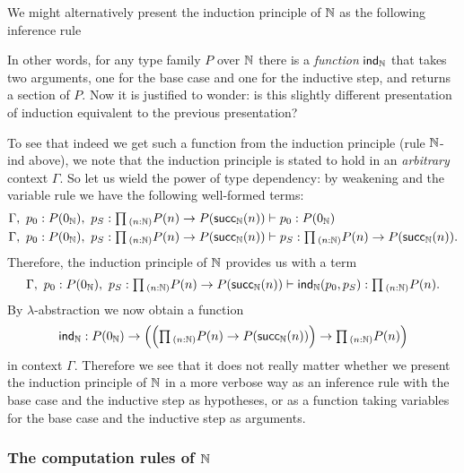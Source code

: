 \begin{rmk}
  We might alternatively present the induction principle of $\N$ as the following inference rule
  \begin{prooftree}
  \end{prooftree}
  In other words, for any type family $P$ over $\N$ there is a \emph{function} $\ind{\N}$ that takes two arguments, one for the base case and one for the inductive step, and returns a section of $P$. Now it is justified to wonder: is this slightly different presentation of induction equivalent to the previous presentation?
  
  To see that indeed we get such a function from the induction principle (rule $\N$-ind above), we note that the induction principle is stated to hold in an \emph{arbitrary} context $\Gamma$. So let us wield the power of type dependency: by weakening and the variable rule we have the following well-formed terms:
  \begin{align*}
    \Gamma,~p_0:P(\zeroN),~p_S:\prd{n:\N}P(n)\to P(\succN(n)) & \vdash p_0 : P(\zeroN) \\
    \Gamma,~p_0:P(\zeroN),~p_S:\prd{n:\N}P(n)\to P(\succN(n)) & \vdash p_S : \prd{n:\N}P(n)\to P(\succN(n)).
  \end{align*}
  Therefore, the induction principle of $\N$ provides us with a term
  \begin{equation*}
    \Gamma,~p_0:P(\zeroN),~p_S:\prd{n:\N}P(n)\to P(\succN(n)) \vdash \mathsf{ind}_\N(p_0,p_S) : \prd{n:\N}P(n).
  \end{equation*}
  By $\lambda$-abstraction we now obtain a function
  \begin{equation*}
    \mathsf{ind}_\N : P(\zeroN)\to \Big(\Big(\prd{n:\N}P(n)\to P(\succN(n))\Big) \to \prd{n:\N}P(n)\Big)
  \end{equation*}
  in context $\Gamma$. Therefore we see that it does not really matter whether we present the induction principle of $\N$ in a more verbose way as an inference rule with the base case and the inductive step as hypotheses, or as a function taking variables for the base case and the inductive step as arguments.
\end{rmk}

\subsubsection{The computation rules of $\N$}

